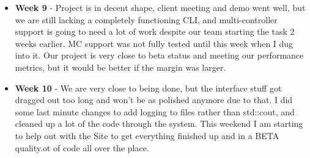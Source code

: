 \documentclass[onecolumn, draftclsnofoot,10pt, compsoc]{IEEEtran}
\begin{document}
\begin{itemize}
					\item \textbf{Week 9} - Project is in decent shape, client meeting and demo went well, but we are still lacking a completely functioning CLI, and multi-controller support is going to need a lot of work despite our team starting the task 2 weeks earlier. MC support was not fully tested until this week when I dug into it. Our project is very close to beta status and meeting our performance metrics, but it would be better if the margin was larger.
					\item \textbf{Week 10} - We are very close to being done, but the interface stuff got dragged out too long and won't be as polished anymore due to that. I did some last minute changes to add logging to files rather than std::cout, and cleaned up a lot of the code through the system. This weekend I am starting to help out with the Site to get everything finished up and in a BETA quality.ot of code all over the place.
				\end{itemize}
\end{document}

